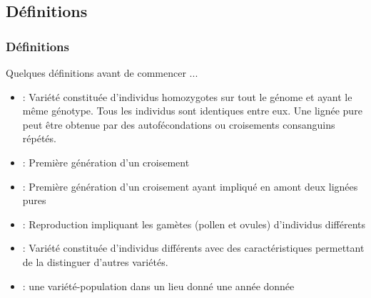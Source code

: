 


\subsection{Définitions}

\begin{frame}
\frametitle{Définitions}

Quelques définitions avant de commencer ...
\begin{itemize}
\item {}:  Variété constituée d’individus homozygotes sur tout le génome et ayant le même génotype. Tous les individus sont identiques entre eux. Une lignée pure peut être obtenue par des autofécondations ou croisements consanguins répétés.

\item {}: Première génération d'un croisement

\item {}: Première génération d'un croisement ayant impliqué en amont deux lignées pures

\item {}: Reproduction impliquant les gamètes (pollen et ovules) d’individus différents

\item {}: Variété constituée d'individus différents avec des caractéristiques permettant de la distinguer d'autres variétés. 

\item {}: une variété-population dans un lieu donné une année donnée

\end{itemize}


\end{frame}

